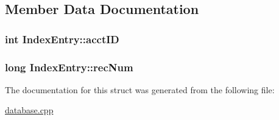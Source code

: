 \subsection{Member Data Documentation}
\hypertarget{struct_index_entry_aa5008695f70f365c7959d42ccca0fa13}{
\subsubsection[{acct\+I\+D}]{\setlength{\rightskip}{0pt plus 5cm}int Index\+Entry\+::acct\+I\+D}}\label{struct_index_entry_aa5008695f70f365c7959d42ccca0fa13}
\hypertarget{struct_index_entry_a3f71077b699f2d718ca60df893c4c470}{
\subsubsection[{rec\+Num}]{\setlength{\rightskip}{0pt plus 5cm}long Index\+Entry\+::rec\+Num}}\label{struct_index_entry_a3f71077b699f2d718ca60df893c4c470}


The documentation for this struct was generated from the following file\+:\begin{DoxyCompactItemize}
\item 
\hyperlink{database_8cpp}{database.\+cpp}\end{DoxyCompactItemize}

